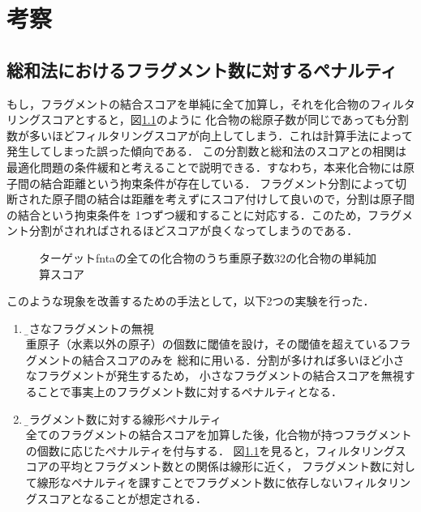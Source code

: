 \chapter{考察}

\section{総和法におけるフラグメント数に対するペナルティ}\label{sec:discussion_penalty}
もし，フラグメントの結合スコアを単純に全て加算し，それを化合物のフィルタリングスコアとすると，図\ref{fig:no_omit_score_graph}のように
化合物の総原子数が同じであっても分割数が多いほどフィルタリングスコアが向上してしまう．これは計算手法によって発生してしまった誤った傾向である．
この分割数と総和法のスコアとの相関は最適化問題の条件緩和と考えることで説明できる．すなわち，本来化合物には原子間の結合距離という拘束条件が存在している．
フラグメント分割によって切断された原子間の結合は距離を考えずにスコア付けして良いので，分割は原子間の結合という拘束条件を
1つずつ緩和することに対応する．このため，フラグメント分割がされればされるほどスコアが良くなってしまうのである．
\begin{figure}[b]
 \begin{center}
  \caption{ターゲットfntaの全ての化合物のうち重原子数32の化合物の単純加算スコア}
  \label{fig:no_omit_score_graph}
 \end{center}
\end{figure}

このような現象を改善するための手法として，以下2つの実験を行った．
\begin{enumerate}
\item \b{小さなフラグメントの無視}\\ 
	重原子（水素以外の原子）の個数に閾値を設け，その閾値を超えているフラグメントの結合スコアのみを
	総和に用いる．分割が多ければ多いほど小さなフラグメントが発生するため，
	小さなフラグメントの結合スコアを無視することで事実上のフラグメント数に対するペナルティとなる．
\item \b{フラグメント数に対する線形ペナルティ}\\
	全てのフラグメントの結合スコアを加算した後，化合物が持つフラグメントの個数に応じたペナルティを付与する．
	図\ref{fig:no_omit_score_graph}を見ると，フィルタリングスコアの平均とフラグメント数との関係は線形に近く，
	フラグメント数に対して線形なペナルティを課すことでフラグメント数に依存しないフィルタリングスコアとなることが想定される．
\end{enumerate}

